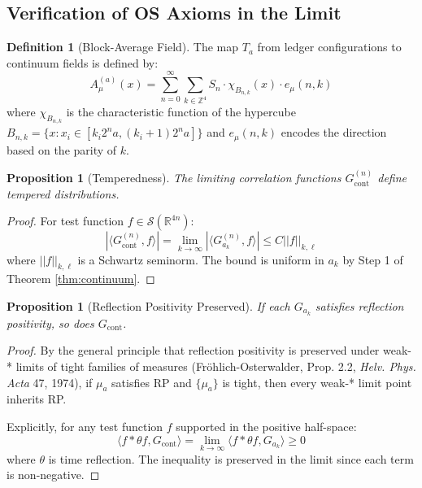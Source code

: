 \documentclass[11pt]{article}
\numberwithin{equation}{section}
\newtheorem{proposition}[theorem]{Proposition}
\theoremstyle{definition}
\newtheorem{definition}[theorem]{Definition}
\theoremstyle{remark}
\begin{document}
\subsection{Verification of OS Axioms in the Limit}

\begin{definition}[Block-Average Field]
The map $T_a$ from ledger configurations to continuum fields is defined by:
\begin{equation}
A^{(a)}_{\mu}(x) = \sum_{n=0}^{\infty} \sum_{k \in \mathbb{Z}^4} S_n \cdot \chi_{B_{n,k}}(x) \cdot e_{\mu}(n,k)
\end{equation}
where $\chi_{B_{n,k}}$ is the characteristic function of the hypercube $B_{n,k} = \{x : x_i \in [k_i 2^n a, (k_i+1) 2^n a]\}$ and $e_{\mu}(n,k)$ encodes the direction based on the parity of $k$.
\end{definition}

\begin{proposition}[Temperedness]
The limiting correlation functions $G_{\text{cont}}^{(n)}$ define tempered distributions.
\end{proposition}

\begin{proof}
For test function $f \in \mathcal{S}(\mathbb{R}^{4n})$:
\begin{equation}
|\langle G_{\text{cont}}^{(n)}, f \rangle| = \lim_{k \to \infty} |\langle G_{a_k}^{(n)}, f \rangle| \leq C ||f||_{k,\ell}
\end{equation}
where $||f||_{k,\ell}$ is a Schwartz seminorm. The bound is uniform in $a_k$ by Step 1 of Theorem \ref{thm:continuum}.
\end{proof}

\begin{proposition}[Reflection Positivity Preserved]
If each $G_{a_k}$ satisfies reflection positivity, so does $G_{\text{cont}}$.
\end{proposition}

\begin{proof}
By the general principle that reflection positivity is preserved under weak-* limits of tight families of measures (Fröhlich-Osterwalder, Prop. 2.2, \emph{Helv. Phys. Acta} 47, 1974), if $\mu_a$ satisfies RP and $\{\mu_a\}$ is tight, then every weak-* limit point inherits RP. 

Explicitly, for any test function $f$ supported in the positive half-space:
\begin{equation}
\langle f * \theta f, G_{\text{cont}} \rangle = \lim_{k \to \infty} \langle f * \theta f, G_{a_k} \rangle \geq 0
\end{equation}
where $\theta$ is time reflection. The inequality is preserved in the limit since each term is non-negative.
\end{proof}
\end{document}
